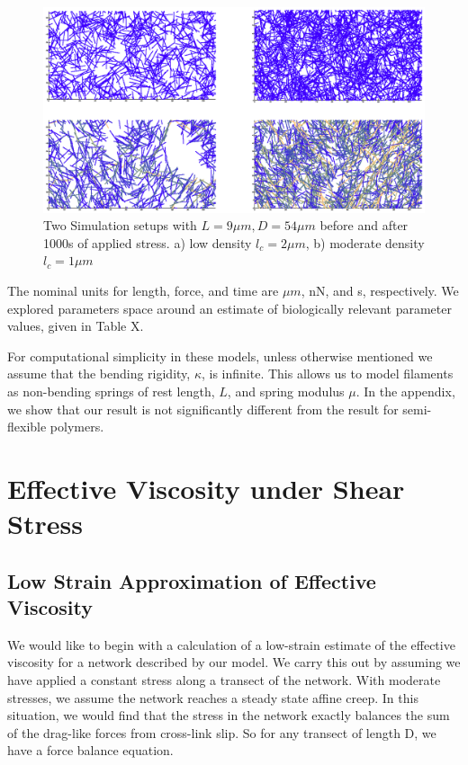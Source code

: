 \documentclass[pre,reprint]{revtex4-1}
\begin{document}
\begin{figure}[h!]
\centering
\includegraphics[width=\hsize]{network_def}
\caption{\label{fig:sim}Two Simulation setups with $L=9 \mu m, D = 54 \mu m$ before and after 1000s of applied stress. a) low density $l_c=2 \mu m$, b) moderate density $l_c=1 \mu m$ }
\end{figure}

The nominal units for length, force, and time are $\mu m$, nN, and s, respectively.  We explored parameters space around an estimate of biologically relevant parameter values, given in Table X. 

For computational simplicity in these models, unless otherwise mentioned we assume that the bending rigidity, $\kappa$, is infinite. This allows us to model filaments as non-bending springs of rest length, $L$, and spring modulus $\mu$.  In the appendix, we show that our result is not significantly different from the result for semi-flexible polymers.































\section{Effective Viscosity under Shear Stress}


\subsection{Low Strain Approximation of Effective Viscosity}
We would like to begin with a calculation of a low-strain estimate of the effective viscosity for a network described by our model.  We carry this out by assuming we have applied a constant stress along a transect of the network.  With moderate stresses, we assume the network reaches a steady state affine creep. In this situation, we would find that the stress in the network exactly balances the sum of the drag-like forces from cross-link slip.  So for any transect of length D, we have a force balance equation.
\end{document}
